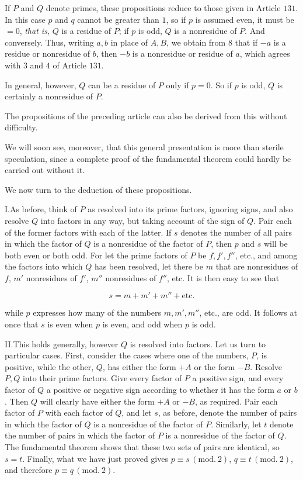 If $P$ and $Q$ denote primes, these propositions reduce to those given in Article $131$. In this case $p$ and $q$ cannot be greater than $1$, so if $p$ is assumed even, it must be $=0$, \emph{that is,} $Q$ is a residue of $P$; if $p$ is odd, $Q$ is a nonresidue of $P$. And conversely. Thus, writing $a,b$ in place of $A,B$, we obtain from $8$ that if $-a$ is a residue or nonresidue of $b$, then $-b$ is a nonresidue or residue of $a$, which agrees with $3$ and $4$ of Article $131$.

In general, however, $Q$ can be a residue of $P$ only if $p=0$. So if $p$ is odd, $Q$ is certainly a nonresidue of $P$.

The propositions of the preceding article can also be derived from this without difficulty.

We will soon see, moreover, that this general presentation is more than sterile speculation, since a complete proof of the fundamental theorem could hardly be carried out without it.

We now turn to the deduction of these propositions.

I.\quad As before, think of $P$ as resolved into its prime factors, ignoring signs, and also resolve $Q$ into factors in any way, but taking account of the sign of $Q$. Pair each of the former factors with each of the latter. If $s$ denotes the number of all pairs in which the factor of $Q$ is a nonresidue of the factor of $P$, then $p$ and $s$ will be both even or both odd. For let the prime factors of $P$ be $f,f',f''$, etc., and among the factors into which $Q$ has been resolved, let there be $m$ that are nonresidues of $f$, $m'$ nonresidues of $f'$, $m''$ nonresidues of $f''$, etc. It is then easy to see that

\[
s=m+m'+m''+\text{etc.}
\]

while $p$ expresses how many of the numbers $m,m',m''$, etc., are odd. It follows at once that $s$ is even when $p$ is even, and odd when $p$ is odd.

II.\quad This holds generally, however $Q$ is resolved into factors. Let us turn to particular cases. First, consider the cases where one of the numbers, $P$, is positive, while the other, $Q$, has either the form $+A$ or the form $-B$. Resolve $P,Q$ into their prime factors. Give every factor of $P$ a positive sign, and every factor of $Q$ a positive or negative sign according to whether it has the form $a$ or $b$. Then $Q$ will clearly have either the form $+A$ or $-B$, as required. Pair each factor of $P$ with each factor of $Q$, and let $s$, as before, denote the number of pairs in which the factor of $Q$ is a nonresidue of the factor of $P$. Similarly, let $t$ denote the number of pairs in which the factor of $P$ is a nonresidue of the factor of $Q$. The fundamental theorem shows that these two sets of pairs are identical, so $s=t$. Finally, what we have just proved gives $p\equiv s\, (\mathrm{mod.}\ 2)$, $q\equiv t\, (\mathrm{mod.}\ 2)$, and therefore $p\equiv q\, (\mathrm{mod.}\ 2)$.

